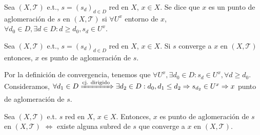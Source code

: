 \begin{defn}[Aglomeración]
  Sea $( X, \mathcal{T} )$ e.t., $s = (s_{d})_{d \in D}$ red en $X$, $x \in X$. Se dice que $x$ es un punto de aglomeración de $s$ en $( X, \mathcal{T} )$ si $\forall U^{x}$ entorno de $x$, $\forall d_{0} \in D, \exists d \in D : d \geq d_{0}, s_{d} \in U^{x}$.
\end{defn}

\begin{prop}
  Sea $( X, \mathcal{T} )$ e.t., $s = (s_{d})_{d \in D}$ red en $X$, $x \in X$. Si $s$ converge a $x$ en $( X, \mathcal{T} )$ entonces, $x$ es punto de aglomeración de $s$.
\end{prop}

\begin{dem}
  Por la definición de convergencia, tenemos que $\forall U^{x}, \exists d_{0} \in D : s_{d} \in U^{x}, \forall d \geq d_{0}$. Consideramos, $\forall d_{1} \in D \xRightarrow[]{ \text{cj. dirigido} } \exists d_{2} \in D : d_{0}, d_{1} \leq d_{2} \Rightarrow s_{d_{2}} \in U^{x} \Rightarrow x$ punto de aglomeración de $s$.
\end{dem}

\begin{prop}
  Sea $( X, \mathcal{T} )$ e.t. $s$ red en $X$, $x \in X$. Entonces, $x$ es punto de aglomeración de $s$ en $( X, \mathcal{T} )$ $\Leftrightarrow$ existe alguna subred de $s$ que converge a $x$ en $( X, \mathcal{T} )$.
\end{prop}

